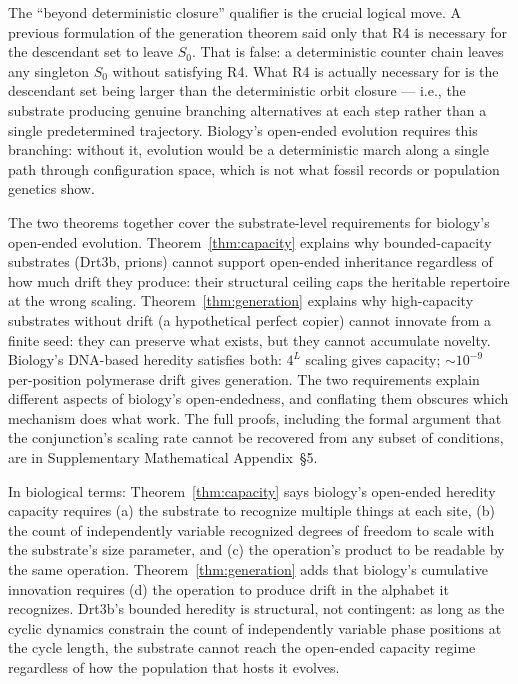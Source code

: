 \documentclass[aps,prx,reprint,amsmath,amssymb,floatfix,superscriptaddress,nofootinbib]{revtex4-2}
\theoremstyle{plain-thm}
\theoremstyle{definition-thm}
\begin{document}
The ``beyond deterministic closure'' qualifier is the crucial logical move. A previous formulation of the generation theorem said only that R4 is necessary for the descendant set to leave $S_0$. That is false: a deterministic counter chain leaves any singleton $S_0$ without satisfying R4. What R4 is actually necessary for is the descendant set being larger than the deterministic orbit closure --- i.e., the substrate producing genuine branching alternatives at each step rather than a single predetermined trajectory. Biology's open-ended evolution requires this branching: without it, evolution would be a deterministic march along a single path through configuration space, which is not what fossil records or population genetics show.

The two theorems together cover the substrate-level requirements for biology's open-ended evolution. Theorem~\ref{thm:capacity} explains why bounded-capacity substrates (Drt3b, prions) cannot support open-ended inheritance regardless of how much drift they produce: their structural ceiling caps the heritable repertoire at the wrong scaling. Theorem~\ref{thm:generation} explains why high-capacity substrates without drift (a hypothetical perfect copier) cannot innovate from a finite seed: they can preserve what exists, but they cannot accumulate novelty. Biology's DNA-based heredity satisfies both: $4^L$ scaling gives capacity; $\sim 10^{-9}$ per-position polymerase drift gives generation. The two requirements explain different aspects of biology's open-endedness, and conflating them obscures which mechanism does what work. The full proofs, including the formal argument that the conjunction's scaling rate cannot be recovered from any subset of conditions, are in Supplementary Mathematical Appendix~\S5.

In biological terms: Theorem~\ref{thm:capacity} says biology's open-ended heredity capacity requires (a) the substrate to recognize multiple things at each site, (b) the count of independently variable recognized degrees of freedom to scale with the substrate's size parameter, and (c) the operation's product to be readable by the same operation. Theorem~\ref{thm:generation} adds that biology's cumulative innovation requires (d) the operation to produce drift in the alphabet it recognizes. Drt3b's bounded heredity is structural, not contingent: as long as the cyclic dynamics constrain the count of independently variable phase positions at the cycle length, the substrate cannot reach the open-ended capacity regime regardless of how the population that hosts it evolves.
\end{document}
